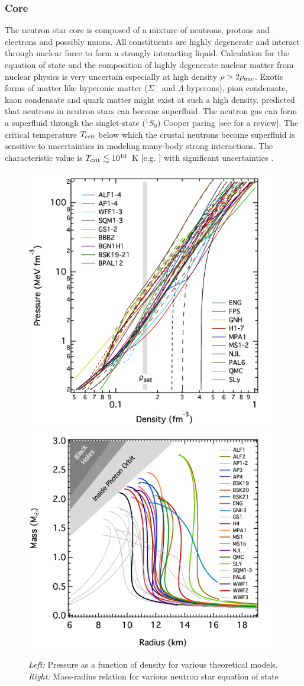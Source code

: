 \subsubsection{Core}
The neutron star core is composed of a mixture of neutrons, protons and electrons and possibly muons.
All constituents are highly degenerate and interact through nuclear force to form a strongly interacting liquid.
Calculation for the equation of state and the composition of highly degenerate nuclear matter from nuclear physics is very uncertain especially at high density $\rho>2\rho_{\rm nuc}$.
Exotic forms of matter like hyperonic matter ($\Sigma^-$ and $\Lambda$ hyperons), pion condensate, kaon condensate and quark matter might exist at such a high density.  
\citet{1959NucPh..13..655M} predicted that neutrons in neutron stars can become superfluid.
The neutron gas can form a superfluid through the singlet-state ($^1 S_0$) Cooper paring [see \citet{2003RvMP...75..607D} for a review].
The critical temperature $T_{\rm crit}$ below which the crustal neutrons become superfluid is sensitive to uncertainties in modeling many-body strong interactions. The characteristic value is $T_{\rm crit} \lesssim 10^{10}$~K [e.g. \citet{1999PhyU...42..737Y,2001LNP...578...30L}] with significant uncertainties \citep{2004ARA&A..42..169Y, 2009ApJ...707.1131P,2012MNRAS.422.2632H,2015PhRvC..91a5806H}.

%
\begin{figure}[h]
  \centering
  \includegraphics[height=0.4\textwidth]{pics/intro/eos.png}
  \includegraphics[height=0.4\textwidth]{pics/intro/mass-radius.png}
  \caption[Equation of state and mass-radius relation for neutron stars] {{\it Left:} Pressure as a function of density for various theoretical models. {\it Right:} Mass-radius relation for various neutron star equation of state \citep{2016ARA&A..54..401O}}
  \label{fig:NS-eos}
\end{figure}
%


